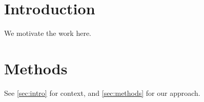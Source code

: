 \section{Introduction}\label{sec:intro}

We motivate the work here.

\section{Methods}\label{sec:methods}

See \autoref{sec:intro} for context, and \autoref{sec:methods} for our approach.
